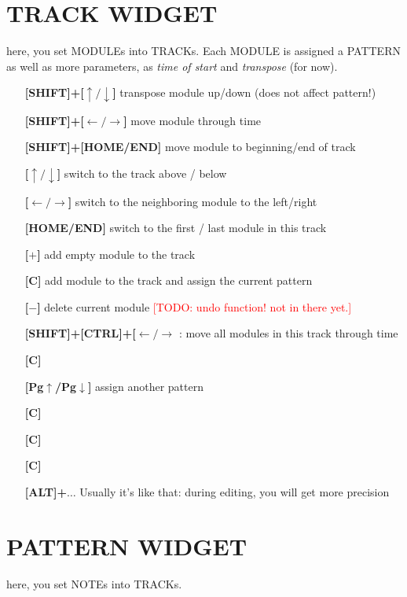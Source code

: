 \documentclass[11pt]{article}
\begin{document}
\section{TRACK WIDGET}
    here, you set MODULEs into TRACKs. Each MODULE is assigned a PATTERN as well as more parameters, as \emph{time of start} and \emph{transpose} (for now).
    \begin{itemize}
            \item[\textbf{[SHIFT]+[$\uparrow\!/\!\downarrow$]}] transpose module up/down (does not affect pattern!)
            \item[\textbf{[SHIFT]+[$\leftarrow\!/\!\rightarrow$]}] move module through time
            \item[\textbf{[SHIFT]+[HOME/END]}] move module to beginning/end of track
            \item[\textbf{[$\uparrow\!/\!\downarrow$]}] switch to the track above / below
            \item[\textbf{[$\leftarrow\!/\!\rightarrow$]}] switch to the neighboring module to the left/right
            \item[\textbf{[HOME/END]}] switch to the first / last module in this track
            \item[\textbf{[$+$]}] add empty module to the track
            \item[\textbf{[C]}] add module to the track and assign the current pattern
            \item[\textbf{[$-$]}] delete current module \textcolor{red}{[TODO: undo function! not in there yet.]}
            \item[\textbf{[SHIFT]+[CTRL]+[$\leftarrow\!/\!\rightarrow$}]: move all modules in this track through time
            \item[\textbf{[C]}] 
            \item[\textbf{[Pg$\uparrow$/Pg$\downarrow$]}] assign another pattern 
            \item[\textbf{[C]}] 
            \item[\textbf{[C]}] 
            \item[\textbf{[C]}] 
            
            \item[\textbf{[ALT]+$\ldots$}]     Usually it's like that: during editing, you will get more precision
    \end{itemize}
\section{PATTERN WIDGET}
    here, you set NOTEs into TRACKs.
    \begin{itemize}
    \end{itemize}
\end{document}

